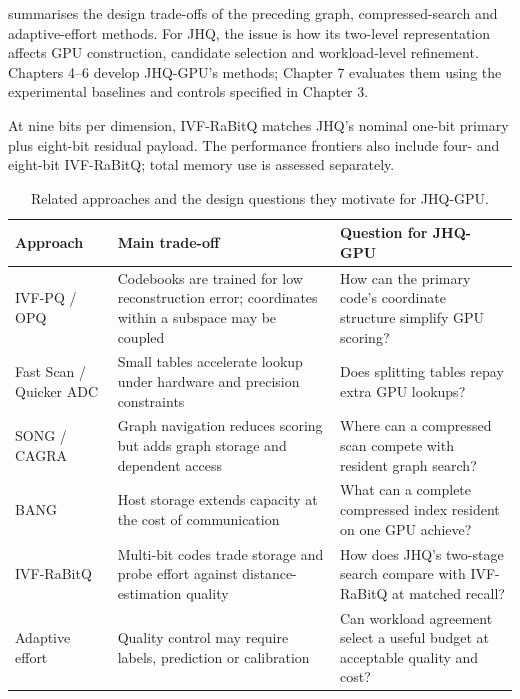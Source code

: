  summarises the design trade-offs of the preceding
graph, compressed-search and adaptive-effort methods. For JHQ, the issue
is how its two-level representation affects GPU construction, candidate
selection and workload-level refinement. Chapters 4--6 develop JHQ-GPU's
methods; Chapter 7 evaluates them using the experimental baselines and
controls specified in Chapter 3.

At nine bits per dimension, IVF-RaBitQ matches JHQ's nominal one-bit
primary plus eight-bit residual payload. The performance frontiers also
include four- and eight-bit IVF-RaBitQ; total memory use is assessed separately.

\begin{table}[!htbp]
\centering
\caption[Related approaches and JHQ-GPU design questions]{Related approaches and the design questions they motivate for JHQ-GPU.}
\label{tab:2-position}
\footnotesize\setlength{\tabcolsep}{4pt}
\begin{tabularx}{\linewidth}{@{}>{\raggedright\arraybackslash}p{.20\linewidth}*{2}{>{\raggedright\arraybackslash}X}@{}}
\toprule
Approach & Main trade-off & Question for JHQ-GPU \\
\midrule
IVF-PQ / OPQ & Codebooks are trained for low reconstruction error; coordinates within a subspace may be coupled & How can the primary code's coordinate structure simplify GPU scoring? \\
Fast Scan / Quicker ADC & Small tables accelerate lookup under hardware and precision constraints & Does splitting tables repay extra GPU lookups? \\
SONG / CAGRA & Graph navigation reduces scoring but adds graph storage and dependent access & Where can a compressed scan compete with resident graph search? \\
BANG & Host storage extends capacity at the cost of communication & What can a complete compressed index resident on one GPU achieve? \\
IVF-RaBitQ & Multi-bit codes trade storage and probe effort against distance-estimation quality & How does JHQ's two-stage search compare with IVF-RaBitQ at matched recall? \\
Adaptive effort & Quality control may require labels, prediction or calibration & Can workload agreement select a useful budget at acceptable quality and cost? \\
\bottomrule
\end{tabularx}
\end{table}
